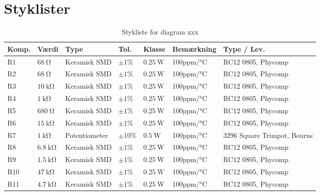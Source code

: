 \chapter{Styklister} \label{bilag:styklister}

\begin{table}[h!]
\small
\centering
\caption{Stykliste for diagram xxx}
\label{tab:udstyr}
\begin{threeparttable}
\begin{tabular}{ l l l l l l l }
\toprule
\multicolumn{1}{l}{\textbf{Komp.}}       &
\multicolumn{1}{l}{\textbf{Værdi}}       &
\multicolumn{1}{l}{\textbf{Type}}       &
\multicolumn{1}{l}{\textbf{Tol.}} &
\multicolumn{1}{l}{\textbf{Klasse}} &
\multicolumn{1}{l}{\textbf{Bemærkning}} &
\multicolumn{1}{l}{\textbf{Type / Lev.}}  \\ 
\hline
R1 & $\SI{68}{\ohm}$			& Keramisk	SMD	& $\pm 1\%$ 		 & $\SI{0.25}{\watt}$	  & 100ppm/\si{\celsius}  & RC12 0805, Phycomp \\
R2 & $\SI{68}{\ohm}$			& Keramisk	SMD	& $\pm 1\%$ 		 & $\SI{0.25}{\watt}$	  & 100ppm/\si{\celsius}  & RC12 0805, Phycomp \\
R3 & $\SI{10}{\kilo\ohm}$		& Keramisk	SMD	& $\pm 1\%$ 		 & $\SI{0.25}{\watt}$	  & 100ppm/\si{\celsius}  & RC12 0805, Phycomp \\
R4 & $\SI{1}{\kilo\ohm}$		& Keramisk	SMD	& $\pm 1\%$ 		 & $\SI{0.25}{\watt}$	  & 100ppm/\si{\celsius}  & RC12 0805, Phycomp \\
R5 & $\SI{680}{\ohm}$			& Keramisk	SMD	& $\pm 1\%$ 		 & $\SI{0.25}{\watt}$	  & 100ppm/\si{\celsius}  & RC12 0805, Phycomp \\
R6 & $\SI{15}{\kilo\ohm}$		& Keramisk	SMD	& $\pm 1\%$ 		 & $\SI{0.25}{\watt}$	  & 100ppm/\si{\celsius}  & RC12 0805, Phycomp \\
R7 & $\SI{1}{\kilo\ohm}$		& Potentiometer		& $\pm 10\%$ 		 & $\SI{0.5}{\watt}$	  & 100ppm/\si{\celsius}  & 3296 Square Trimpot, Bourns  \\
R8 & $\SI{6.8}{\kilo\ohm}$		& Keramisk	SMD	& $\pm 1\%$ 		 & $\SI{0.25}{\watt}$	  & 100ppm/\si{\celsius}  & RC12 0805, Phycomp \\
R9 & $\SI{1.5}{\kilo\ohm}$		& Keramisk	SMD	& $\pm 1\%$ 		 & $\SI{0.25}{\watt}$	  & 100ppm/\si{\celsius}  & RC12 0805, Phycomp \\
R10 & $\SI{47}{\kilo\ohm}$		& Keramisk	SMD	& $\pm 1\%$ 		 & $\SI{0.25}{\watt}$	  & 100ppm/\si{\celsius}  & RC12 0805, Phycomp \\
R11 & $\SI{4.7}{\kilo\ohm}$		& Keramisk	SMD	& $\pm 1\%$ 		 & $\SI{0.25}{\watt}$	  & 100ppm/\si{\celsius}  & RC12 0805, Phycomp \\

\end{tabular}
\end{threeparttable}
\end{table}
